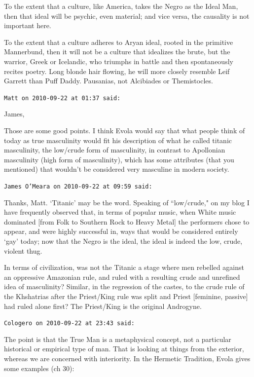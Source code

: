 \begin{footnotesize}
\begin{sffamily}
To the extent that a culture, like America, takes the Negro as the Ideal Man, then that ideal will be psychic, even material; and vice versa, the causality is not important here.

To the extent that a culture adheres to Aryan ideal, rooted in the primitive Mannerbund, then it will not be a culture that idealizes the brute, but the warrior, Greek or Icelandic, who triumphs in battle and then spontaneously recites poetry. Long blonde hair flowing, he will more closely resemble Leif Garrett than Puff Daddy. Pausanias, not Alcibiades or Themistocles.


\hfill

\texttt{Matt on 2010-09-22 at 01:37 said: }

James,

Those are some good points. I think Evola would say that what people think of today as true masculinity would fit his description of what he called titanic masculinity, the low/crude form of masculinity, in contrast to Apollonian masculinity (high form of masculinity), which has some attributes (that you mentioned) that wouldn't be considered very masculine in modern society.


\hfill

\texttt{James O'Meara on 2010-09-22 at 09:59 said: }

Thanks, Matt. `Titanic' may be the word. Speaking of ``low/crude," on my blog I have frequently observed that, in terms of popular music, when White music dominated [from Folk to Southern Rock to Heavy Metal] the performers chose to appear, and were highly successful in, ways that would be considered entirely `gay' today; now that the Negro is the ideal, the ideal is indeed the low, crude, violent thug. 

In terms of civilization, was not the Titanic a stage where men rebelled against an oppressive Amazonian rule, and ruled with a resulting crude and unrefined idea of masculinity? Similar, in the regression of the castes, to the crude rule of the Khshatrias after the Priest/King rule was split and Priest [feminine, passive] had ruled alone first? The Priest/King is the original Androgyne.


\hfill

\texttt{Cologero on 2010-09-22 at 23:43 said: }

The point is that the True Man is a metaphysical concept, not a particular historical or empirical type of man. That is looking at things from the exterior, whereas we are concerned with interiority. In the Hermetic Tradition, Evola gives some examples (ch 30):


\end{sffamily}
\end{footnotesize}
